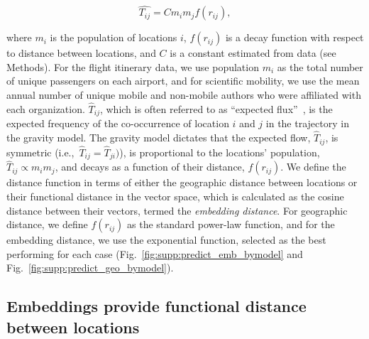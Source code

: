 \documentclass[12pt]{article} %
\def\ie{i.e.,~}
\begin{document}
\begin{equation}
	\label{eq:gravity_basic}
	\hat{T_{ij}} = Cm_{i}m_{j}f(r_{ij}),
\end{equation}

where $m_{i}$ is the population of locations $i$,  $f(r_{ij})$ is a decay function with respect to distance between locations, and $C$ is a constant estimated from data (see Methods). 
For the flight itinerary data, we use population $m_{i}$ as the total number of unique passengers on each airport, and for scientific mobility, we use the mean annual number of unique mobile and non-mobile authors who were affiliated with each organization.
$\hat{T}_{ij}$, which is often referred to as ``expected flux''~\autocite{simini2012universal}, is the expected frequency of the co-occurrence of location $i$ and $j$ in the trajectory in the gravity model.
The gravity model dictates that the expected flow, $\hat{T}_{ij}$, is symmetric (\ie $\hat{T}_{ij }= \hat{T}_{ji})$), is proportional to the locations' population, $\hat{T}_{ij} \propto m_{i} m_{j}$, and decays as a function of their distance, $f(r_{ij})$. 
We define the distance function in terms of either the geographic distance between locations or their functional distance in the vector space, which is calculated as the cosine distance between their vectors, termed the \textit{embedding distance}. 
For geographic distance, we define $f(r_{ij})$ as the standard power-law function, and for the embedding distance, we use the exponential function, selected as the best performing for each case (Fig.~\ref{fig:supp:predict_emb_bymodel} and Fig.~\ref{fig:supp:predict_geo_bymodel}).


%
%
%
\subsection*{Embeddings provide functional distance between locations}
\end{document}
